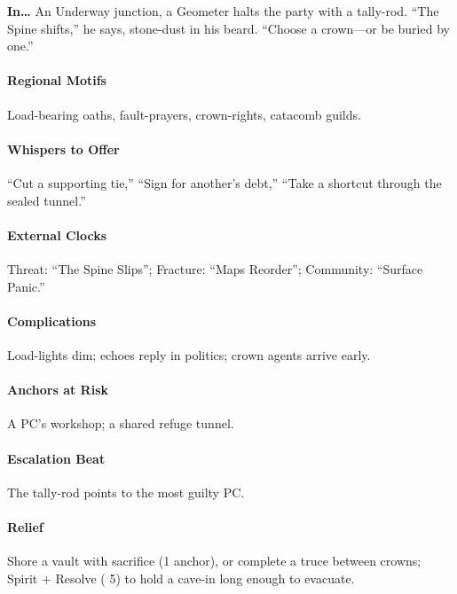 \textbf{In…} An Underway junction, a Geometer halts the party with a tally-rod. ``The Spine shifts,'' he says, stone-dust in his beard. ``Choose a crown—or be buried by one.''
\paragraph{Regional Motifs} Load-bearing oaths, fault-prayers, crown-rights, catacomb guilds.
\paragraph{Whispers to Offer} ``Cut a supporting tie,'' ``Sign for another’s debt,'' ``Take a shortcut through the sealed tunnel.''
\paragraph{External Clocks} Threat: ``The Spine Slips''; Fracture: ``Maps Reorder''; Community: ``Surface Panic.''
\paragraph{Complications} Load-lights dim; echoes reply in politics; crown agents arrive early.
\paragraph{Anchors at Risk} A PC’s workshop; a shared refuge tunnel.
\paragraph{Escalation Beat} The tally-rod points to the most guilty PC.
\paragraph{Relief} Shore a vault with sacrifice (1 anchor), or complete a truce between crowns; Spirit + Resolve (\DV{} 5) to hold a cave-in long enough to evacuate.



